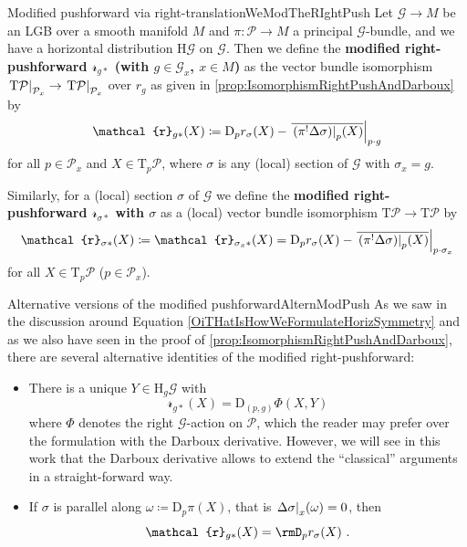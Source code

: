 \documentclass[reqno,a4paper,oneside]{amsart}
\theoremstyle{plain}
\theoremstyle{remark}
\theoremstyle{definition}
\begin{document}
\begin{definitions}{Modified pushforward via right-translation}{WeModTheRIghtPush}
Let $\mathcal{G} \to M$ be an LGB over a smooth manifold $M$ and $\pi\colon\mathcal{P} \to M$ a principal $\mathcal{G}$-bundle, and we have a horizontal distribution $\mathrm{H}\mathcal{G}$ on $\mathcal{G}$. Then we define the \textbf{modified right-pushforward $\mathcal{r}_{g*}$ (with $g \in \mathcal{G}_x$, $x \in M$)} as the vector bundle isomorphism $\mleft.\mathrm{T}\mathcal{P}\mright|_{\mathcal{P}_x} \to \mleft.\mathrm{T}\mathcal{P}\mright|_{\mathcal{P}_x}$ over $r_g$ as given in \ref{prop:IsomorphismRightPushAndDarboux} by
\begin{equation*}
\mathcal{r}_{g*}(X)
\coloneqq
\mathrm{D}_pr_\sigma\mleft( X \mright)
	- \mleft.{\overline{
		\mleft. \mleft( \pi^!\Delta\sigma \mright) \mright|_p(X)
	}}\mright|_{p \cdot g}
\end{equation*}
for all $p \in \mathcal{P}_x$ and $X \in \mathrm{T}_p \mathcal{P}$, where $\sigma$ is any (local) section of $\mathcal{G}$ with $\sigma_x = g$.

Similarly, for a (local) section $\sigma$ of $\mathcal{G}$ we define the \textbf{modified right-pushforward $\mathcal{r}_{\sigma*}$ with $\sigma$} as a (local) vector bundle isomorphism $\mathrm{T}\mathcal{P} \to \mathrm{T}\mathcal{P}$ by
\begin{equation*}
\mathcal{r}_{\sigma*}(X)
\coloneqq
\mathcal{r}_{\sigma_x*}(X)
=
\mathrm{D}_pr_\sigma\mleft( X \mright)
	- \mleft.{\overline{
		\mleft. \mleft( \pi^!\Delta\sigma \mright) \mright|_p(X)
	}}\mright|_{p \cdot \sigma_{x}}
\end{equation*}
for all $X \in \mathrm{T}_p \mathcal{P}$ ($p \in \mathcal{P}_x$).
\end{definitions}

\begin{remarks}{Alternative versions of the modified pushforward}{AlternModPush}
As we saw in the discussion around Equation \eqref{OiTHatIsHowWeFormulateHorizSymmetry} and as we also have seen in the proof of \ref{prop:IsomorphismRightPushAndDarboux}, there are several alternative identities of the modified right-pushforward: 
\begin{itemize}
	\item There is a unique $Y \in \mathrm{H}_g\mathcal{G}$ with
	\begin{equation*}
	\mathcal{r}_{g*}(X)
	=
	\mathrm{D}_{(p, g)}\Phi(X,Y)
	\end{equation*}
	where $\Phi$ denotes the right $\mathcal{G}$-action on $\mathcal{P}$, which the reader may prefer over the formulation with the Darboux derivative. However, we will see in this work that the Darboux derivative allows to extend the ``classical'' arguments in a straight-forward way.
	\item If $\sigma$ is parallel along $\omega \coloneqq \mathrm{D}_p\pi(X)$, that is $\mleft.\Delta \sigma\mright|_x(\omega) = 0$, then
	\begin{equation*}
	\mathcal{r}_{g*}(X)
	=
	\rmD_pr_\sigma(X)~.
	\end{equation*}
\end{itemize}
\end{remarks}
\end{document}
